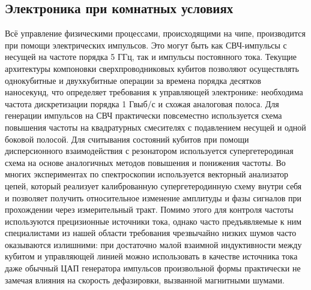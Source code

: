 \documentclass[14pt, a4paper]{extreport}
\numberwithin{equation}{section}
\begin{document}
\subsection{Электроника при комнатных условиях}

Всё управление физическими процессами, происходящими на чипе, производится при помощи электрических импульсов. Это могут быть как СВЧ-импульсы с несущей на частоте порядка 5 ГГц, так и импульсы постоянного тока. Текущие архитектуры компоновки сверхпроводниковых кубитов позволяют осуществлять однокубитные и двухкубитные операции за времена порядка десятков наносекунд, что определяет требования к управляющей электронике: необходима частота дискретизации порядка 1 Гвыб/с и схожая аналоговая полоса. Для генерации импульсов на СВЧ практически повсеместно используется схема повышения частоты на квадратурных смесителях с подавлением несущей и одной боковой полосой. Для считывания состояний кубитов при помощи дисперсионного взаимодействия с резонатором используется супергетеродиная схема на основе аналогичных методов повышения и понижения частоты. Во многих экспериментах по спектроскопии используется векторный анализатор цепей, который реализует калиброванную супергетеродинную схему внутри себя и позволяет получить относительное изменение амплитуды и фазы сигналов при прохождении через измерительный тракт. Помимо этого для контроля частоты используются прецизионные источники тока, однако часто предъявляемые к ним специалистами из нашей области требования чрезвычайно низких шумов часто оказываются излишними: при достаточно малой взаимной индуктивности между кубитом и управляющей линией можно использовать в качестве источника тока даже обычный ЦАП генератора импульсов произвольной формы практически не замечая влияния на скорость дефазировки, вызванной магнитными шумами.
\end{document}
